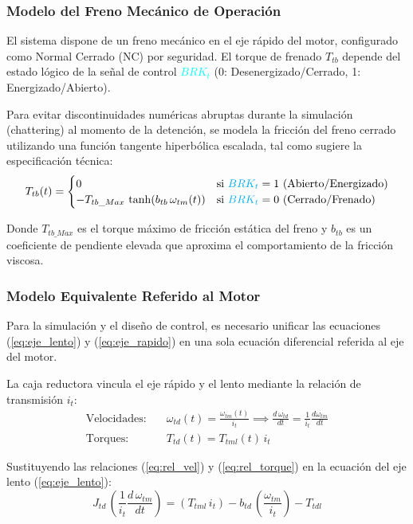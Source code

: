 \documentclass[11pt]{article}                                    %
\begin{document}
\subsubsection*{Modelo del Freno Mecánico de Operación}
El sistema dispone de un freno mecánico en el eje rápido del motor, configurado como Normal Cerrado (NC) por seguridad. El torque de frenado $T_{tb}$ depende del estado lógico de la señal de control \textcolor{cyan}{$BRK_t$} (0: Desenergizado/Cerrado, 1: Energizado/Abierto).

Para evitar discontinuidades numéricas abruptas durante la simulación (chattering) al momento de la detención, se modela la fricción del freno cerrado utilizando una función tangente hiperbólica escalada, tal como sugiere la especificación técnica:
\begin{equation} \label{eq:brake_model}
    T_{tb}(t) = 
    \begin{cases} 
        0 & \text{si } \textcolor{cyan}{BRK_t} = 1 \text{ (Abierto/Energizado)} \\
        -T_{tb\_Max} \, \tanh(b_{tb} \, \omega_{tm}(t)) & \text{si } \textcolor{cyan}{BRK_t} = 0 \text{ (Cerrado/Frenado)}
    \end{cases}
\end{equation}

Donde $T_{tb\_Max}$ es el torque máximo de fricción estática del freno y $b_{tb}$ es un coeficiente de pendiente elevada que aproxima el comportamiento de la fricción viscosa.

\subsubsection*{Modelo Equivalente Referido al Motor}
Para la simulación y el diseño de control, es necesario unificar las ecuaciones (\ref{eq:eje_lento}) y (\ref{eq:eje_rapido}) en una sola ecuación diferencial referida al eje del motor.

La caja reductora vincula el eje rápido y el lento mediante la relación de transmisión $i_t$:
\begin{align}
    \text{Velocidades:} & \quad \omega_{td}(t) = \frac{\omega_{tm}(t)}{i_t} \implies \frac{d \, \omega_{td}}{dt} = \frac{1}{i_t}\frac{d\omega_{tm}}{dt} \label{eq:rel_vel} \\
    \text{Torques:} & \quad T_{td}(t) = T_{tml}(t) \, i_t \label{eq:rel_torque}
\end{align}

Sustituyendo las relaciones (\ref{eq:rel_vel}) y (\ref{eq:rel_torque}) en la ecuación del eje lento (\ref{eq:eje_lento}):
\begin{equation*}
    J_{td} \, \left( \frac{1}{i_t} \frac{d \, \omega_{tm}}{dt} \right) = (T_{tml} \, i_t) - b_{td} \, \left( \frac{\omega_{tm}}{i_t} \right) - T_{tdl}
\end{equation*}
\end{document}
